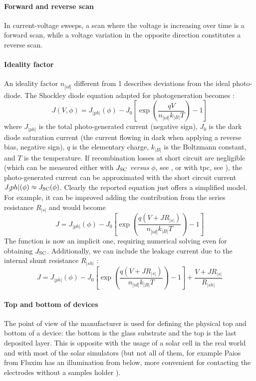 		\paragraph{Forward and reverse scan} In current-voltage sweeps, a scan where the voltage is increasing over time is a forward scan, while a voltage variation in the opposite direction constitutes a reverse scan.

		\paragraph{Ideality factor} An ideality factor $n_|id|$ different from 1 describes deviations from the ideal photo-diode.
		The Shockley diode equation adapted for photogeneration becomes \cite{Calado2018b}:
		\begin{equation} \label{eq:photodiode}
			J(V,\phi) = J_|ph|(\phi) - J_0\left[\exp(\frac{qV}{n_|id|k_|B|T})-1\right]
		\end{equation}
		where $J_|ph|$ is the total photo-generated current (negative sign), $J_0$ is the dark diode saturation current (the current flowing in dark when applying a reverse bias, negative sign), $q$ is the elementary charge, $k_|B|$ is the Boltzmann constant, and $T$ is the temperature.
		If recombination losses at short circuit are negligible (which can be measured either with $J_\mathrm{SC}$ \textit{versus} $\phi$, see , or with \gls{tpc}, see ), the photo-generated current can be approximated with the short circuit current $J_|ph|(\phi) \approx J_\mathrm{SC}(\phi)$.
		Clearly the reported equation just offers a simplified model.
		For example, it can be improved adding the contribution from the series resistance $R_|s|$ and would become
		$$J = J_|ph|(\phi) - J_0\left[\exp(\frac{q(V+JR_|s|)}{n_|id|k_|B|T})-1\right]$$
		The function is now an implicit one, requiring numerical solving even for obtaining $J_\mathrm{SC}$.
		Additionally, we can include the leakage current due to the internal shunt resistance $R_|sh|$ \cite{Tvingstedt2017}:
		$$J = J_|ph|(\phi) - J_0\left[\exp(\frac{q(V+JR_|s|)}{n_|id|k_|B|T})-1\right] + \frac{V+JR_|s|}{R_|sh|}$$
		
		\paragraph{Top and bottom of devices} The point of view of the manufacturer is used for defining the physical top and bottom of a device: the bottom is the glass substrate and the top is the last deposited layer.
		This is opposite with the usage of a solar cell in the real world and with most of the solar simulators (but not all of them, for example Paios from Fluxim has an illumination from below, more convenient for contacting the electrodes without a samples holder \cite{Fluxim}).

